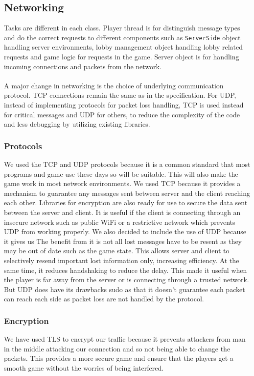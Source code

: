 \documentclass[12pt]{article}
\newcommand{\return}{\\\\\noindent}
\begin{document}
\subsection{Networking}
Tasks are different in each class. Player thread is for distinguish message types and do the correct requests to different components such as \texttt{ServerSide} object handling server environments, lobby management object handling lobby related requests and game logic for requests in the game. Server object is for handling incoming connections and packets from the network. \return
A major change in networking is the choice of underlying communication protocol. TCP connections remain the same as in the specification. For UDP, instead of implementing protocols for packet loss handling, TCP is used instead for critical messages and UDP for others, to reduce the complexity of the code and less debugging by utilizing existing libraries.
\subsubsection{Protocols}
We used the TCP and UDP protocols because it is a common standard that most programs and game use these days so will be suitable. This will also make the game work in most network environments.
We used TCP because it provides a mechanism to guarantee any messages sent between server and the client reaching each other. Libraries for encryption are also ready for use to secure the data sent between the server and client. It is useful if the client is connecting through an insecure network such as public WiFi or a restrictive network which prevents UDP from working properly.
We also decided to include the use of UDP because it gives us The benefit from it is not all lost messages have to be resent as they may be out of date such as the game state. This allows server and client to selectively resend important lost information only, increasing efficiency. At the same time, it reduces handshaking to reduce the delay. This made it useful when the player is far away from the server or is connecting through a trusted network. But UDP does have its drawbacks sudo as that it doesn’t guarantee each packet can reach each side as packet loss are not handled by the protocol.
\subsubsection{Encryption}
We have used TLS to encrypt our traffic because it prevents attackers from man in the middle attacking our connection and so not being able to change the packets. This provides a more secure game and ensure that the players get a smooth game without the worries of being interfered.
\end{document}
